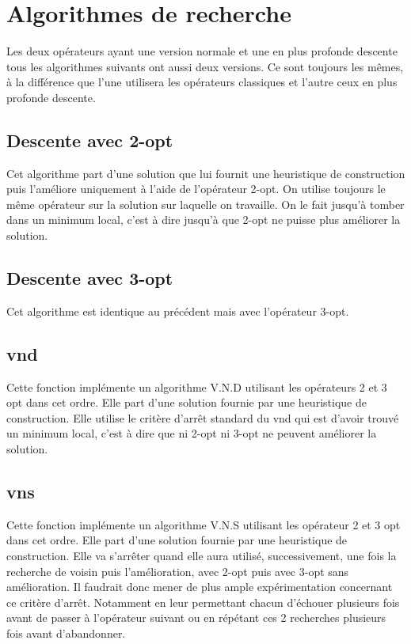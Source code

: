 \documentclass[12pt,a4paper]{article}
\begin{document}
\section{Algorithmes de recherche}

Les deux opérateurs ayant une version normale et une en plus profonde descente tous les algorithmes suivants ont aussi deux versions. Ce sont toujours les mêmes, à la différence que l'une utilisera les opérateurs classiques et l'autre ceux en plus profonde descente.

\subsection{Descente avec 2-opt}

Cet algorithme part d'une solution que lui fournit une heuristique de construction puis l’améliore uniquement à l'aide de l'opérateur 2-opt. On utilise toujours le même opérateur sur la solution sur laquelle on travaille. On le fait jusqu’à tomber dans un minimum local, c'est à dire jusqu’à que 2-opt ne puisse plus améliorer la solution.

\subsection{Descente avec 3-opt}

Cet algorithme est identique au précédent mais avec l'opérateur 3-opt.

\subsection{vnd}

Cette fonction implémente un algorithme V.N.D utilisant les opérateurs 2 et 3 opt dans cet ordre. Elle part d'une solution fournie par une heuristique de construction. Elle utilise le critère d’arrêt standard du vnd qui est d'avoir trouvé un minimum local, c'est à dire que ni 2-opt ni 3-opt ne peuvent améliorer la solution.

\subsection{vns}

Cette fonction implémente un algorithme V.N.S utilisant les opérateur 2 et 3 opt dans cet ordre. Elle part d'une solution fournie par une heuristique de construction. Elle va s’arrêter quand elle aura utilisé, successivement, une fois la recherche de voisin puis l'amélioration, avec 2-opt puis avec 3-opt sans amélioration. Il faudrait donc mener de plus ample expérimentation concernant ce critère d’arrêt. Notamment en leur permettant chacun d'échouer plusieurs fois avant de passer à l'opérateur suivant ou en répétant ces 2 recherches plusieurs fois avant d'abandonner.
\end{document}
